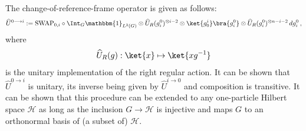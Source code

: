 
    The change-of-reference-frame operator is given as follows:
    \begin{gather}
        \widehat{U}^{0\longrightarrow i} := \mathrm{SWAP}_{0,i}\circ\Int_G\mathbbm{1}_{L^2(G)}\otimes \widehat{U}_R(g_i^0)^{\otimes i-2}\otimes\ket{g^i_0}\bra{g^0_i}\otimes\widehat{U}_R(g_i^0)^{\otimes n-i-2}\,dg^0_i\,,
    \end{gather}
    where
    \begin{gather}
        \widehat{U}_R(g):\ket{x}\mapsto\ket{xg^{-1}}
    \end{gather}
    is the unitary implementation of the right regular action. It can be shown that $\widehat{U}^{0\longrightarrow i}$ is unitary, its inverse being given by $\widehat{U}^{i\longrightarrow 0}$ and composition is transitive. It can be shown that this procedure can be extended to any one-particle Hilbert space $\mathcal{H}$ as long as the inclusion $G\rightarrow\mathcal{H}$ is injective and maps $G$ to an orthonormal basis of (a subset of) $\mathcal{H}$.